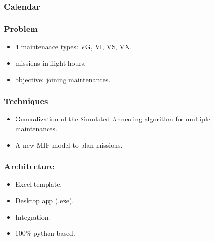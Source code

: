 \section[Dassault]{\dassault}

\begin{frame}
\frametitle{\textbf{Calendar}}

    


\end{frame}

\begin{frame}
\frametitle{\textbf{Problem}}

  \begin{itemize}[<+->]
    \item 4 maintenance types: VG, VI, VS, VX.
    \item missions in flight hours.
    \item objective: joining maintenances.
  \end{itemize}
\end{frame}

\begin{frame}
\frametitle{\textbf{Techniques}}

  \begin{itemize}[<+->]
    \item Generalization of the Simulated Annealing algorithm for multiple maintenances.
    \item A new MIP model to plan missions.
  \end{itemize}
  

\end{frame}

\begin{frame}
\frametitle{\textbf{Architecture}}

  \begin{itemize}[<+->]
    \item Excel template.
    \item Desktop app (.exe).
    \item Integration.
    \item 100\% python-based.
  \end{itemize}

  \begin{adjustbox}{max totalsize={.7\textwidth}{.7\textheight},center}
    
  \end{adjustbox}


\end{frame}

